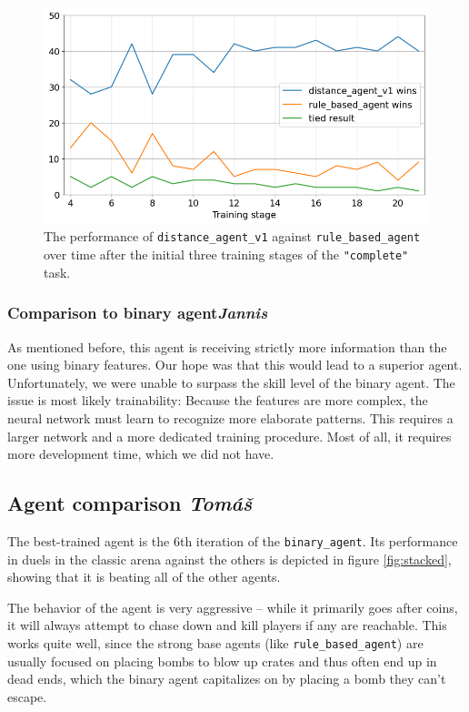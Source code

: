 \documentclass{article}
\begin{document}
\begin{figure}[h]
    \centering
    \includegraphics[width=.6\linewidth]{figures/distance_agent_training.png}
    \caption{The performance of \texttt{distance\_agent\_v1} against \texttt{rule\_based\_agent} over time after the initial three training stages of the \texttt{"complete"} task.}
    \label{fig:distance_agent_training}
\end{figure}

\subsubsection[Comparison to binary agent]{Comparison to binary agent{\normalsize \normalfont \it \hfill Jannis}}

As mentioned before, this agent is receiving strictly more information than the one using binary features. Our hope was that this would lead to a superior agent. Unfortunately, we were unable to surpass the skill level of the binary agent. The issue is most likely trainability: Because the features are more complex, the neural network must learn to recognize more elaborate patterns. This requires a larger network and a more dedicated training procedure. Most of all, it requires more development time, which we did not have.

\clearpage

\subsection[Agent comparison]{Agent comparison {\normalsize \normalfont \it \hfill Tomáš}}

The best-trained agent is the 6th iteration of the \texttt{binary\_agent}.
Its performance in duels in the classic arena against the others is depicted in figure \ref{fig:stacked}, showing that it is beating all of the other agents.

The behavior of the agent is very aggressive -- while it primarily goes after coins, it will always attempt to chase down and kill players if any are reachable.
This works quite well, since the strong base agents (like \texttt{rule\_based\_agent}) are usually focused on placing bombs to blow up crates and thus often end up in dead ends, which the binary agent capitalizes on by placing a bomb they can't escape.
\end{document}
